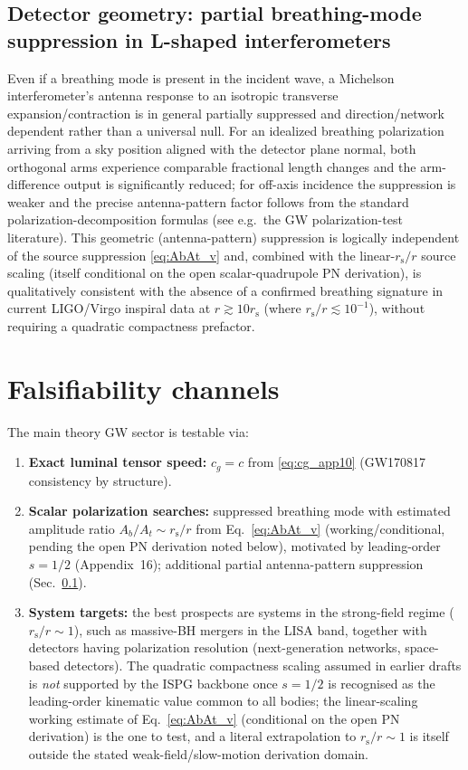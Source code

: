 \documentclass[11pt]{article}
\newcommand{\rs}{r_{\mathrm{s}}}
\begin{document}
\subsection{Detector geometry: partial breathing-mode suppression in L-shaped interferometers}\label{sec:det}
Even if a breathing mode is present in the incident wave, a Michelson interferometer's antenna response to an isotropic transverse expansion/contraction is in general partially suppressed and direction/network dependent rather than a universal null. For an idealized breathing polarization arriving from a sky position aligned with the detector plane normal, both orthogonal arms experience comparable fractional length changes and the arm-difference output is significantly reduced; for off-axis incidence the suppression is weaker and the precise antenna-pattern factor follows from the standard polarization-decomposition formulas (see e.g.\ the GW polarization-test literature). This geometric (antenna-pattern) suppression is logically independent of the source suppression \eqref{eq:AbAt_v} and, combined with the linear-$\rs/r$ source scaling (itself conditional on the open scalar-quadrupole PN derivation), is qualitatively consistent with the absence of a confirmed breathing signature in current LIGO/Virgo inspiral data at $r\gtrsim 10\rs$ (where $\rs/r\lesssim 10^{-1}$), without requiring a quadratic compactness prefactor.

\section{Falsifiability channels}\label{sec:test}
The main theory GW sector is testable via:
\begin{enumerate}
\item \textbf{Exact luminal tensor speed:} $c_g=c$ from \eqref{eq:cg_app10} (GW170817~\cite{LIGO_GW170817} consistency by structure).
\item \textbf{Scalar polarization searches:} suppressed breathing mode with estimated amplitude ratio $A_b/A_t\sim \rs/r$ from Eq.~\eqref{eq:AbAt_v} (working/conditional, pending the open PN derivation noted below), motivated by leading-order $s=1/2$ (Appendix~16); additional partial antenna-pattern suppression (Sec.~\ref{sec:det}).
\item \textbf{System targets:} the best prospects are systems in the strong-field regime ($\rs/r\sim 1$), such as massive-BH mergers in the LISA band, together with detectors having polarization resolution (next-generation networks, space-based detectors). The quadratic compactness scaling assumed in earlier drafts is \emph{not} supported by the ISPG backbone once $s=1/2$ is recognised as the leading-order kinematic value common to all bodies; the linear-scaling working estimate of Eq.~\eqref{eq:AbAt_v} (conditional on the open PN derivation) is the one to test, and a literal extrapolation to $\rs/r\sim 1$ is itself outside the stated weak-field/slow-motion derivation domain.
\end{enumerate}
\end{document}
